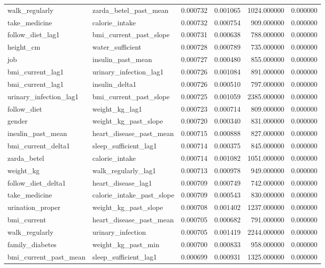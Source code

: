 \begin{longtable}{llrrrr}
walk\_regularly & zarda\_betel\_past\_mean & 0.000732 & 0.001065 & 1024.000000 & 0.000000 \\
take\_medicine & calorie\_intake & 0.000732 & 0.000754 & 909.000000 & 0.000000 \\
follow\_diet\_lag1 & bmi\_current\_past\_slope & 0.000731 & 0.000638 & 788.000000 & 0.000000 \\
height\_cm & water\_sufficient & 0.000728 & 0.000789 & 735.000000 & 0.000000 \\
job & insulin\_past\_mean & 0.000727 & 0.000480 & 855.000000 & 0.000000 \\
bmi\_current\_lag1 & urinary\_infection\_lag1 & 0.000726 & 0.001084 & 891.000000 & 0.000000 \\
bmi\_current\_lag1 & insulin\_delta1 & 0.000726 & 0.000510 & 797.000000 & 0.000000 \\
urinary\_infection\_lag1 & bmi\_current\_past\_slope & 0.000725 & 0.001059 & 2385.000000 & 0.000000 \\
follow\_diet & weight\_kg\_lag1 & 0.000723 & 0.000714 & 809.000000 & 0.000000 \\
gender & weight\_kg\_past\_slope & 0.000720 & 0.000340 & 831.000000 & 0.000000 \\
insulin\_past\_mean & heart\_disease\_past\_mean & 0.000715 & 0.000888 & 827.000000 & 0.000000 \\
bmi\_current\_delta1 & sleep\_sufficient\_lag1 & 0.000714 & 0.000375 & 845.000000 & 0.000000 \\
zarda\_betel & calorie\_intake & 0.000714 & 0.001082 & 1051.000000 & 0.000000 \\
weight\_kg & walk\_regularly\_lag1 & 0.000713 & 0.000978 & 949.000000 & 0.000000 \\
follow\_diet\_delta1 & heart\_disease\_lag1 & 0.000709 & 0.000749 & 742.000000 & 0.000000 \\
take\_medicine & calorie\_intake\_past\_slope & 0.000709 & 0.000543 & 830.000000 & 0.000000 \\
urination\_proper & weight\_kg\_past\_slope & 0.000708 & 0.001402 & 1237.000000 & 0.000000 \\
bmi\_current & heart\_disease\_past\_mean & 0.000705 & 0.000682 & 791.000000 & 0.000000 \\
walk\_regularly & urinary\_infection & 0.000705 & 0.001419 & 2244.000000 & 0.000000 \\
family\_diabetes & weight\_kg\_past\_min & 0.000700 & 0.000833 & 958.000000 & 0.000000 \\
bmi\_current\_past\_mean & sleep\_sufficient\_lag1 & 0.000699 & 0.000931 & 1325.000000 & 0.000000 \\

\end{longtable}
